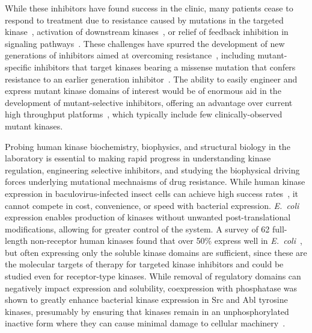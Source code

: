 \documentclass[9pt,lineno]{elife}
\begin{document}
While these inhibitors have found success in the clinic, many patients cease to respond to treatment due to resistance caused by mutations in the targeted kinase~\citep{Pao:2005dp}, activation of downstream kinases~\citep{knight_targeting_2010}, or relief of feedback inhibition in signaling pathways~\citep{chandarlapaty_akt_2011}. 
These challenges have spurred the development of new generations of inhibitors aimed at overcoming resistance~\citep{Jia:2016di,Politi:2015fg}, including mutant-specific inhibitors that target kinases bearing a missense mutation that confers resistance to an earlier generation inhibitor~\citep{Song:2015gu}. 
The ability to easily engineer and express mutant kinase domains of interest would be of enormous aid in the development of mutant-selective inhibitors, offering an advantage over current high throughput platforms~\citep{karaman:nature-biotech:2008:kinase-selectivity-map,Davis:2011fz,Medard:2015hv}, which typically include few clinically-observed mutant kinases. 

Probing human kinase biochemistry, biophysics, and structural biology in the laboratory is essential to making rapid progress in understanding kinase regulation, engineering selective inhibitors, and studying the biophysical driving forces underlying mutational mechnaisms of drug resistance.
While human kinase expression in baculovirus-infected insect cells can achieve high success rates~\citep{vertex:2004:kinase-expression,wang:protein-express-pur:2008:high-yield-kinase-insect-cells}, it cannot compete in cost, convenience, or speed with bacterial expression. \emph{E.~coli} expression enables production of kinases without unwanted post-translational modifications, allowing for greater control of the system.  
A survey of 62 full-length non-receptor human kinases found that over 50\% express well in \emph{E.~coli}~\citep{vertex:2004:kinase-expression}, but often expressing only the soluble kinase domains are sufficient, since these are the molecular targets of therapy for targeted kinase inhibitors and could be studied even for receptor-type kinases. While removal of regulatory domains can negatively impact expression and solubility, coexpression with phosphatase was shown to greatly enhance bacterial kinase expression in Src and Abl tyrosine kinases, presumably by ensuring that kinases remain in an unphosphorylated inactive form where they can cause minimal damage to cellular machinery~\citep{seeliger:2005:protein-sci:kinase-expression}. 
\end{document}
